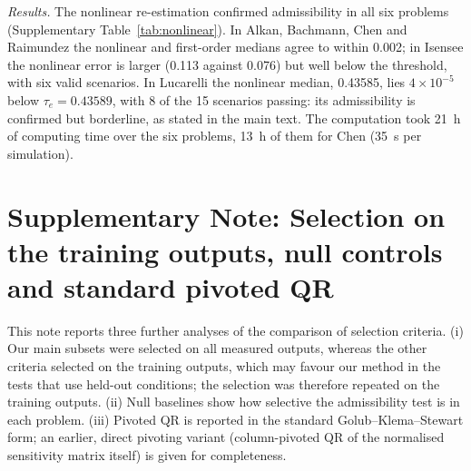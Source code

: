 \emph{Results.} The nonlinear re-estimation confirmed admissibility in all six problems (Supplementary Table~\ref{tab:nonlinear}). In Alkan, Bachmann, Chen and Raimundez the nonlinear and first-order medians agree to within 0.002; in Isensee the nonlinear error is larger (0.113 against 0.076) but well below the threshold, with six valid scenarios. In Lucarelli the nonlinear median, 0.43585, lies $4\times10^{-5}$ below $\tau_e=0.43589$, with 8 of the 15 scenarios passing: its admissibility is confirmed but borderline, as stated in the main text. The computation took 21~h of computing time over the six problems, 13~h of them for Chen (35~s per simulation).

\begin{table}[ht]
\centering\scriptsize
\caption{\textbf{Nonlinear check of the problems decided to first order.} Median $e_{\mathrm{fit}}$ over the 15 scenarios at $\pm$5\% to first order (as in the selection) and after nonlinear re-estimation of the final subset; valid scenarios, fraction of them with $e_{\mathrm{fit}}\le\tau_e$, and computing time.}\label{tab:nonlinear}

\end{table}

\section*{Supplementary Note: Selection on the training outputs, null controls and standard pivoted QR}

This note reports three further analyses of the comparison of selection criteria. (i) Our main subsets were selected on all measured outputs, whereas the other criteria selected on the training outputs, which may favour our method in the tests that use held-out conditions; the selection was therefore repeated on the training outputs. (ii) Null baselines show how selective the admissibility test is in each problem. (iii) Pivoted QR is reported in the standard Golub--Klema--Stewart form; an earlier, direct pivoting variant (column-pivoted QR of the normalised sensitivity matrix itself) is given for completeness.

